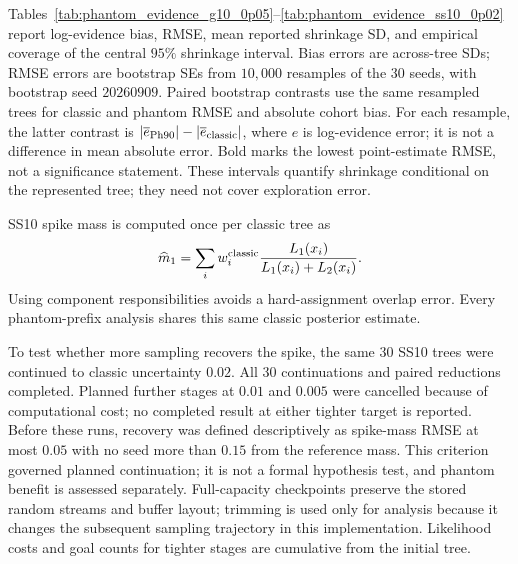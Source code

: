 Tables~\ref{tab:phantom_evidence_g10_0p05}--\ref{tab:phantom_evidence_ss10_0p02} report log-evidence bias, RMSE, mean reported shrinkage SD, and empirical coverage of the central $95\%$ shrinkage interval.
Bias errors are across-tree SDs; RMSE errors are bootstrap SEs from $10{,}000$ resamples of the $30$ seeds, with bootstrap seed $20260909$.
Paired bootstrap contrasts use the same resampled trees for classic and phantom RMSE and absolute cohort bias.
For each resample, the latter contrast is $|\overline e_{\rm Ph90}|-|\overline e_{\rm classic}|$, where $e$ is log-evidence error; it is not a difference in mean absolute error.
Bold marks the lowest point-estimate RMSE, not a significance statement.
These intervals quantify shrinkage conditional on the represented tree; they need not cover exploration error.

SS10 spike mass is computed once per classic tree as
\begin{align}
    \widehat m_1=\sum_i w_i^{\rm classic}
       \frac{L_1(x_i)}{L_1(x_i)+L_2(x_i)}.
\end{align}
Using component responsibilities avoids a hard-assignment overlap error.
Every phantom-prefix analysis shares this same classic posterior estimate.

To test whether more sampling recovers the spike, the same $30$ SS10 trees were continued to classic uncertainty $0.02$.
All $30$ continuations and paired reductions completed. Planned further stages at $0.01$ and $0.005$ were cancelled because of computational cost; no completed result at either tighter target is reported.
Before these runs, recovery was defined descriptively as spike-mass RMSE at most $0.05$ with no seed more than $0.15$ from the reference mass.
This criterion governed planned continuation; it is not a formal hypothesis test, and phantom benefit is assessed separately.
Full-capacity checkpoints preserve the stored random streams and buffer layout; trimming is used only for analysis because it changes the subsequent sampling trajectory in this implementation.
Likelihood costs and goal counts for tighter stages are cumulative from the initial tree.
